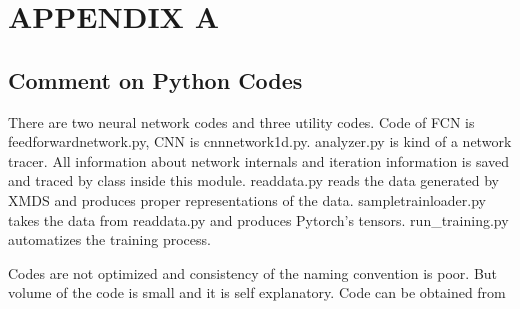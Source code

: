 \documentclass[a4paper,times,12pt]{article}
\begin{document}
\clearpage




\appendix
\section{APPENDIX A}

\subsection{Comment on Python Codes}

There are two neural network codes and three utility codes. Code of FCN is feedforwardnetwork.py, CNN is cnnnetwork1d.py. analyzer.py is kind of a network tracer. All information about network internals and iteration information is saved and traced by class inside this module. readdata.py reads the data generated by XMDS and produces proper representations of the data. sampletrainloader.py takes the data from readdata.py and produces Pytorch's tensors. run\_training.py automatizes the training process. 


Codes are not optimized and consistency of the naming convention is poor. But volume of the code is small and it is self explanatory. Code can be obtained from 

%
%
%
%
%
%
%
\end{document}
